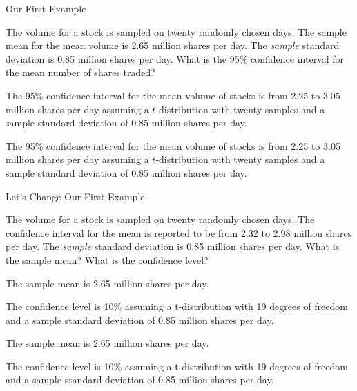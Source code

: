 \begin{frame}{Our First Example}

  The volume for a stock is sampled on twenty randomly chosen
  days. The sample mean for the mean volume is 2.65 million shares per
  day. The {\color{red}\textit{sample}} standard deviation is 0.85
  million shares per day. What is the 95\% confidence interval for the
  mean number of shares traded?

  \vfill

  {

    The 95\% confidence interval for the mean volume of stocks is from
    2.25 to 3.05 million shares per day assuming a $t$-distribution
    with twenty samples and a sample standard deviation of 0.85
    million shares per day.

  }

  {

    The {\color{red}95\%} confidence interval for the mean volume of stocks is from
    {\color{red}2.25} to {\color{red}3.05} million shares per day {\color{red}assuming a $t$-distribution}
    with {\color{red}twenty samples} and a {\color{red}sample standard deviation of 0.85}
    million shares per day.

  }


\end{frame}

  

\begin{frame}{Let's Change Our First Example}

  The volume for a stock is sampled on twenty randomly chosen
  days. The confidence interval for the mean is reported to be from
  2.32 to 2.98 million shares per day. The
  {\color{red}\textit{sample}} standard deviation is 0.85 million
  shares per day. What is the sample mean?  What is the confidence
  level?

  \vfill

  {

    The sample mean is 2.65 million shares per day.

    The confidence level is 10\% assuming a t-distribution with 19
    degrees of freedom and a sample standard deviation of 0.85 million
    shares per day.

  }

  {

    The sample mean is 2.65 million shares per day.

    The confidence level is {\color{red}10\%} assuming a {\color{red}t-distribution} with {\color{red}19
    degrees of freedom} and a {\color{red}sample standard deviation of 0.85 million}
    shares per day.

  }


\end{frame}



